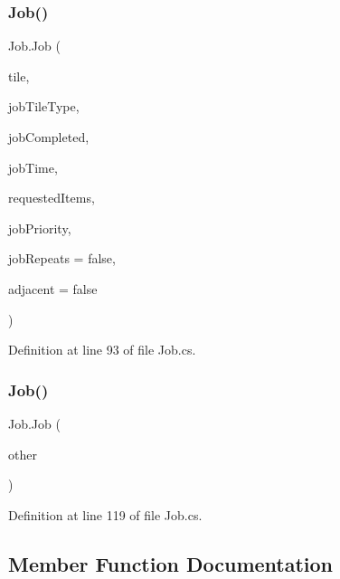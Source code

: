 \subsubsection{\texorpdfstring{Job()}{Job()}\hspace{0.1cm}{\footnotesize\ttfamily [3/4]}}
{\footnotesize\ttfamily Job.\+Job (\begin{DoxyParamCaption}\item[{\hyperlink{class_tile}{Tile}}]{tile,  }\item[{\hyperlink{class_tile_type}{Tile\+Type}}]{job\+Tile\+Type,  }\item[{Action$<$ \hyperlink{class_job}{Job} $>$}]{job\+Completed,  }\item[{float}]{job\+Time,  }\item[{\hyperlink{class_project_porcupine_1_1_jobs_1_1_requested_item}{Requested\+Item} \mbox{[}$\,$\mbox{]}}]{requested\+Items,  }\item[{\hyperlink{class_job_a9c7ab1966c2a0a1d29a7f5822cbca45a}{Job.\+Job\+Priority}}]{job\+Priority,  }\item[{bool}]{job\+Repeats = {\ttfamily false},  }\item[{bool}]{adjacent = {\ttfamily false} }\end{DoxyParamCaption})}



Definition at line 93 of file Job.\+cs.

\mbox{\label{class_job_a733d72f027e5594644fe0cfc0774dcd1}} 
\subsubsection{\texorpdfstring{Job()}{Job()}\hspace{0.1cm}{\footnotesize\ttfamily [4/4]}}
{\footnotesize\ttfamily Job.\+Job (\begin{DoxyParamCaption}\item[{\hyperlink{class_job}{Job}}]{other }\end{DoxyParamCaption})\hspace{0.3cm}{\ttfamily [protected]}}



Definition at line 119 of file Job.\+cs.



\subsection{Member Function Documentation}
\mbox{\label{class_job_adfb8aca515c080a5dabb6d2bc2a8b615}} 
